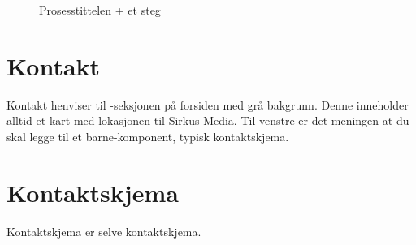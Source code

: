 \begin{figure}[H]
    \centering
    \label{fig:cms-process}
    \caption{Prosesstittelen + et steg}
\end{figure}

\section{Kontakt}
Kontakt henviser til -seksjonen på forsiden med grå bakgrunn. Denne inneholder alltid et kart med lokasjonen til Sirkus Media. Til venstre er det meningen at du skal legge til et barne-komponent, typisk kontaktskjema.

\begin{figure}[H]
    \centering
    \label{fig:cms-contact}
\end{figure}

\section{Kontaktskjema}
Kontaktskjema er selve kontaktskjema.

\begin{figure}[H]
    \centering
    \label{fig:cms-contact-form}
\end{figure}

